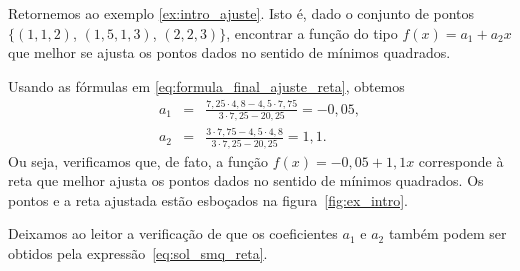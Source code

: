 \begin{ex}\label{ex:calculo_intro_ajuste}
  Retornemos ao exemplo \ref{ex:intro_ajuste}. Isto é, dado o conjunto de pontos $\{(1, 1,2)$, $(1,5, 1,3)$, $(2, 2,3)\}$, encontrar a função do tipo $f(x) = a_1 + a_2x$ que melhor se ajusta os pontos dados no sentido de mínimos quadrados.
\end{ex}
\begin{sol} Usando as fórmulas em \eqref{eq:formula_final_ajuste_reta}, obtemos
  \begin{eqnarray*}
    a_1&=&\frac{7,25 \cdot 4,8 - 4,5 \cdot 7,75  }{3\cdot 7,25 - 20,25 } = -0,05, \\
    a_2&=&\frac{3\cdot 7,75 - 4,5\cdot 4,8}{3\cdot 7,25 - 20,25}=1,1.
  \end{eqnarray*}
Ou seja, verificamos que, de fato, a função $f(x) = -0,05 + 1,1x$ corresponde à reta que melhor ajusta os pontos dados no sentido de mínimos quadrados. Os pontos e a reta ajustada estão esboçados na figura~\ref{fig:ex_intro}.

Deixamos ao leitor a verificação de que os coeficientes $a_1$ e $a_2$ também podem ser obtidos pela expressão~\eqref{eq:sol_smq_reta}.


\end{sol}
